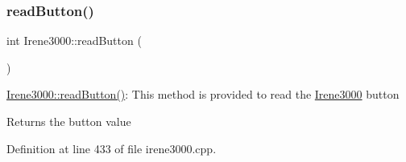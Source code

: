 \subsubsection{\texorpdfstring{read\+Button()}{readButton()}}
{\footnotesize\ttfamily int Irene3000\+::read\+Button (\begin{DoxyParamCaption}{ }\end{DoxyParamCaption})}

\hyperlink{class_irene3000_a78a87eb7cf295b95c12b2ebd51c2bb77}{Irene3000\+::read\+Button()}\+: This method is provided to read the \hyperlink{class_irene3000}{Irene3000} button

\begin{DoxyReturn}{Returns}
the button value 
\end{DoxyReturn}


Definition at line 433 of file irene3000.\+cpp.


